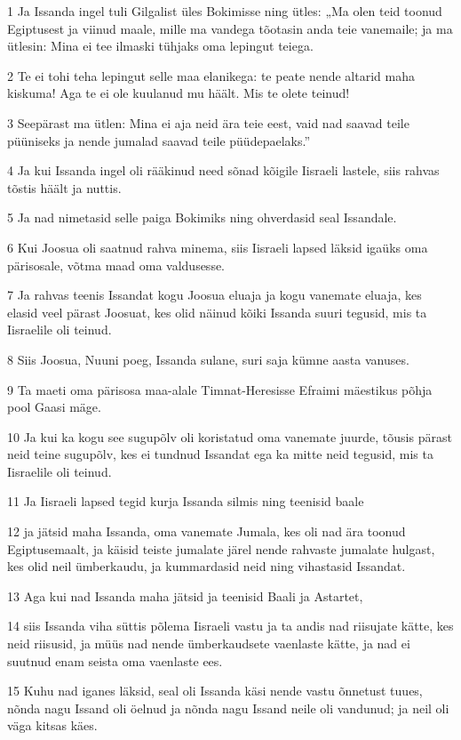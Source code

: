 \par 1 Ja Issanda ingel tuli Gilgalist üles Bokimisse ning ütles: „Ma olen teid toonud Egiptusest ja viinud maale, mille ma vandega tõotasin anda teie vanemaile; ja ma ütlesin: Mina ei tee ilmaski tühjaks oma lepingut teiega.
\par 2 Te ei tohi teha lepingut selle maa elanikega: te peate nende altarid maha kiskuma! Aga te ei ole kuulanud mu häält. Mis te olete teinud!
\par 3 Seepärast ma ütlen: Mina ei aja neid ära teie eest, vaid nad saavad teile püüniseks ja nende jumalad saavad teile püüdepaelaks.”
\par 4 Ja kui Issanda ingel oli rääkinud need sõnad kõigile Iisraeli lastele, siis rahvas tõstis häält ja nuttis.
\par 5 Ja nad nimetasid selle paiga Bokimiks ning ohverdasid seal Issandale.
\par 6 Kui Joosua oli saatnud rahva minema, siis Iisraeli lapsed läksid igaüks oma pärisosale, võtma maad oma valdusesse.
\par 7 Ja rahvas teenis Issandat kogu Joosua eluaja ja kogu vanemate eluaja, kes elasid veel pärast Joosuat, kes olid näinud kõiki Issanda suuri tegusid, mis ta Iisraelile oli teinud.
\par 8 Siis Joosua, Nuuni poeg, Issanda sulane, suri saja kümne aasta vanuses.
\par 9 Ta maeti oma pärisosa maa-alale Timnat-Heresisse Efraimi mäestikus põhja pool Gaasi mäge.
\par 10 Ja kui ka kogu see sugupõlv oli koristatud oma vanemate juurde, tõusis pärast neid teine sugupõlv, kes ei tundnud Issandat ega ka mitte neid tegusid, mis ta Iisraelile oli teinud.
\par 11 Ja Iisraeli lapsed tegid kurja Issanda silmis ning teenisid baale
\par 12 ja jätsid maha Issanda, oma vanemate Jumala, kes oli nad ära toonud Egiptusemaalt, ja käisid teiste jumalate järel nende rahvaste jumalate hulgast, kes olid neil ümberkaudu, ja kummardasid neid ning vihastasid Issandat.
\par 13 Aga kui nad Issanda maha jätsid ja teenisid Baali ja Astartet,
\par 14 siis Issanda viha süttis põlema Iisraeli vastu ja ta andis nad riisujate kätte, kes neid riisusid, ja müüs nad nende ümberkaudsete vaenlaste kätte, ja nad ei suutnud enam seista oma vaenlaste ees.
\par 15 Kuhu nad iganes läksid, seal oli Issanda käsi nende vastu õnnetust tuues, nõnda nagu Issand oli öelnud ja nõnda nagu Issand neile oli vandunud; ja neil oli väga kitsas käes.
